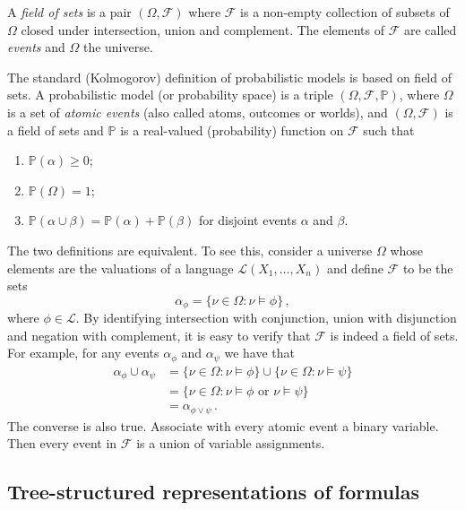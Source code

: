 \documentclass{amsart}
\newcommand{\set}[1]{\mathcal{#1}}
\newcommand{\pr}{\mathbb{P}}
\begin{document}
A \emph{field of sets} is a pair $(\Omega,\set{F})$ where $\set{F}$ is a
non-empty collection of subsets of $\Omega$ closed under intersection,
union and complement. The elements of $\set{F}$ are called \emph{events}
and $\Omega$ the universe. 

The standard (Kolmogorov) definition of probabilistic models is based on
field of sets. A probabilistic model (or probability space) is a triple
$(\Omega, \set{F}, \pr)$, where $\Omega$ is a set of \emph{atomic
  events} (also called atoms, outcomes or worlds), and
$(\Omega, \set{F})$ is a field of sets and $\pr$ is a real-valued
(probability) function on $\set{F}$ such that
\begin{enumerate}[({K}1)]
\item $\pr(\alpha) \geq 0$;
\item $\pr(\Omega) = 1$;
\item $\pr(\alpha \cup \beta)=\pr(\alpha)+\pr(\beta)$ for disjoint
  events $\alpha$ and $\beta$.
\end{enumerate}

The two definitions are equivalent. To see this, consider a universe
$\Omega$ whose elements are the valuations of a language
$\set{L}(X_1,\dotsc,X_n)$ and define $\set{F}$ to be the sets
\begin{equation} \label{field-of-sets}
  \alpha_\phi = \{ \nu \in \Omega: \nu \models \phi \} \,,
\end{equation}
where $\phi \in \set{L}$. By identifying intersection with conjunction,
union with disjunction and negation with complement, it is easy to
verify that $\set{F}$ is indeed a field of sets. For example, for any events $\alpha_\phi$ and $\alpha_\psi$ we have that
\begin{align}
  \alpha_\phi \cup \alpha_\psi &= \{ \nu \in \Omega: \nu \models \phi \} \cup \{ \nu \in \Omega: \nu \models \psi \}\\
  & = \{ \nu \in \Omega: \nu \models \phi \text{ or } \nu \models \psi \}\\
  & = \alpha_{\phi \vee \psi} \, .
\end{align}
The converse is also true. Associate with every atomic event a binary
variable. Then every event in $\set{F}$ is a union of variable
assignments.

\subsection{Tree-structured representations of formulas}
\end{document}
